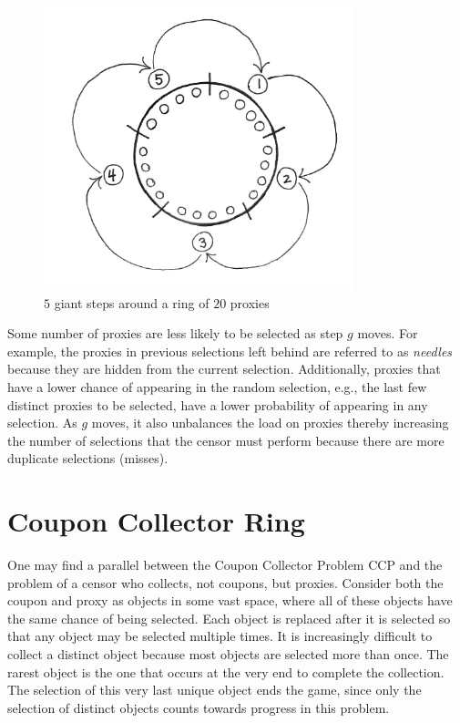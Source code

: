 \begin{figure}[h!]
\centering
     \includegraphics[width=0.8\textwidth]{fig/flower.png}
    \caption{$5$ giant steps around a ring of $20$ proxies}

    \label{fig:giantstepring}
\end{figure}

Some number of proxies are less likely to be selected as step $g$ moves. For example, the proxies in previous selections left behind are referred to as \emph{needles} because they are hidden from the current selection. Additionally, proxies that have a lower chance of appearing in the random selection, e.g., the last few distinct proxies to be selected, have a lower probability of appearing in any selection. As $g$ moves, it also unbalances the load on proxies thereby increasing the number of selections that the censor must perform because there are more duplicate selections (misses).
\section{Coupon Collector Ring}

One may find a parallel between the Coupon Collector Problem \ac{CCP} and the problem of a censor who collects, not coupons, but proxies. Consider both the coupon and proxy as objects in some vast space, where all of these objects have the same chance of being selected. Each object is replaced after it is selected so that any object may be selected multiple times. It is increasingly difficult to collect a distinct object because most objects are selected more than once. The rarest object is the one that occurs at the very end to complete the collection. The selection of this very last unique object ends the game, since only the selection of distinct objects counts towards progress in this problem.

